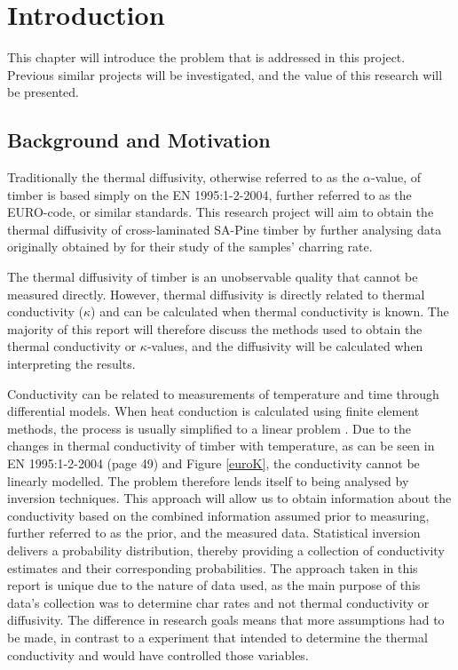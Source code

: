 \chapter{Introduction} \label{introduction}
This chapter will introduce the problem that is addressed in this project. 
Previous similar projects will be investigated, and the value of this research will be presented.

\section{Background and Motivation}

Traditionally the thermal diffusivity, otherwise referred to as the $\alpha$-value, of timber is based simply on the EN 1995:1-2-2004, further referred to as the EURO-code, or similar standards.
This research project will aim to obtain the thermal diffusivity of cross-laminated SA-Pine timber by further analysing data originally obtained by \citeauthor{Westhuyzen:2020} for their study of the samples' charring rate.

The thermal diffusivity of timber is an unobservable quality that cannot be measured directly.
However, thermal diffusivity is directly related to thermal conductivity ($\kappa$) and can be calculated when thermal conductivity is known.
The majority of this report will therefore discuss the methods used to obtain the thermal conductivity or $\kappa$-values, and the diffusivity will be calculated when interpreting the results.

Conductivity can be related to measurements of temperature and time through differential models. 
When heat conduction is calculated using finite element methods, the process is usually simplified to a linear problem \citep{Fish:2007}. 
Due to the changes in thermal conductivity of timber with temperature, as can be seen in EN 1995:1-2-2004 (page 49) and Figure \ref{euroK}, the conductivity cannot be linearly modelled.
The problem therefore lends itself to being analysed by inversion techniques. 
This approach will allow us to obtain information about the conductivity based on the combined information assumed prior to measuring, further referred to as the prior, and the measured data. 
Statistical inversion delivers a probability distribution, thereby providing a collection of conductivity estimates and their corresponding probabilities.
The approach taken in this report is unique due to the nature of data used, as the main purpose of this data's collection was to determine char rates and not thermal conductivity or diffusivity.
The difference in research goals means that more assumptions had to be made, in contrast to a experiment that intended to determine the thermal conductivity and would have controlled those variables.

